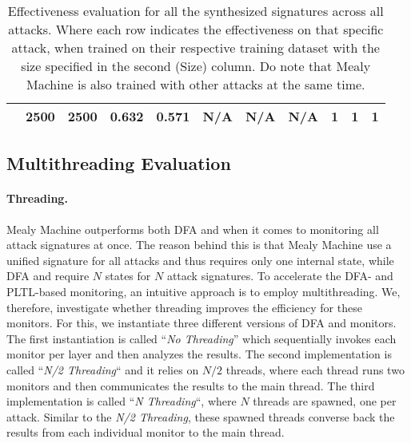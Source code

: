 \begin{table*}[]
{\begin{tabular}{ccccccccccc}
			\multicolumn{1}{|c|}{}                                            & \multicolumn{1}{c|}{2500}          & \multicolumn{1}{c|}{2500}                    & \multicolumn{1}{c|}{0.632}                & \multicolumn{1}{c|}{0.571}            & \multicolumn{1}{c|}{N/A}                      & \multicolumn{1}{c|}{N/A}                   & \multicolumn{1}{c|}{N/A}               & \multicolumn{1}{c|}{1}                      & \multicolumn{1}{c|}{1}                   & \multicolumn{1}{c|}{1}               \\ \hline
		\end{tabular}}
  \caption{Effectiveness evaluation for all the synthesized signatures across all attacks. Where each row indicates the effectiveness on that specific attack, when trained on their respective training dataset with the size specified in the second (Size) column. Do note that Mealy Machine is also trained with other attacks at the same time.}
  \label{app:evaluation_all_generated_monitors}

\end{table*}
\clearpage



\subsection{Multithreading Evaluation}\label{app:threading}

\paragraph{Threading.}
Mealy Machine outperforms both DFA and
\pltl when it comes to monitoring all attack signatures at once.
The reason behind this is that Mealy Machine use a unified signature
for all attacks and thus requires only one internal state,
while DFA and \pltl require $N$ states for $N$ attack signatures.
To accelerate the DFA- and PLTL-based monitoring,
an intuitive approach is to employ multithreading.
We, therefore, investigate whether threading improves
the efficiency for these monitors. For this, we instantiate
three different versions of DFA and \pltl monitors.
The first instantiation is called ``\textit{No Threading}'' which
sequentially invokes each monitor per layer and then analyzes the results.
The second implementation is called ``\textit{N/2 Threading}`` and
it relies on $N/2$ threads, where each thread runs two monitors
and then communicates the results to the main thread.
The third implementation is called ``\textit{N Threading}``,
where $N$ threads are spawned, one per attack.
Similar to the \textit{N/2 Threading}, these spawned threads
converse back the results from each individual monitor to the main thread.

